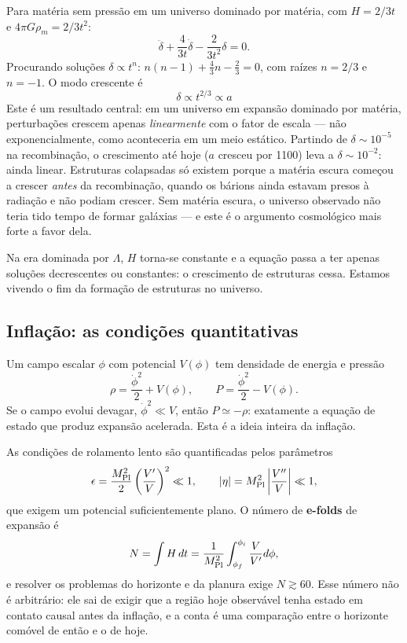 \documentclass[11pt,a4paper]{article}
\begin{document}
Para matéria sem pressão em um universo dominado por matéria, com $H=2/3t$ e $4\pi G\rho_m=2/3t^{2}$:
\[
\ddot{\delta}+\frac{4}{3t}\dot{\delta}-\frac{2}{3t^{2}}\delta=0.
\]
Procurando soluções $\delta\propto t^{n}$: $n(n-1)+\frac{4}{3}n-\frac{2}{3}=0$, com raízes $n=2/3$ e $n=-1$. O modo crescente é
\[
\boxed{\ \delta\propto t^{2/3}\propto a\ }
\]
Este é um resultado central: em um universo em expansão dominado por matéria, perturbações crescem apenas \emph{linearmente} com o fator de escala --- não exponencialmente, como aconteceria em um meio estático. Partindo de $\delta\sim10^{-5}$ na recombinação, o crescimento até hoje ($a$ cresceu por 1100) leva a $\delta\sim10^{-2}$: ainda linear. Estruturas colapsadas só existem porque a matéria escura começou a crescer \emph{antes} da recombinação, quando os bárions ainda estavam presos à radiação e não podiam crescer. Sem matéria escura, o universo observado não teria tido tempo de formar galáxias --- e este é o argumento cosmológico mais forte a favor dela.

Na era dominada por $\Lambda$, $H$ torna-se constante e a equação passa a ter apenas soluções decrescentes ou constantes: o crescimento de estruturas cessa. Estamos vivendo o fim da formação de estruturas no universo.

\subsection*{Inflação: as condições quantitativas}

Um campo escalar $\phi$ com potencial $V(\phi)$ tem densidade de energia e pressão
\[
\rho=\frac{\dot{\phi}^{2}}{2}+V(\phi),
\qquad
P=\frac{\dot{\phi}^{2}}{2}-V(\phi).
\]
Se o campo evolui devagar, $\dot{\phi}^{2}\ll V$, então $P\simeq-\rho$: exatamente a equação de estado que produz expansão acelerada. Esta é a ideia inteira da inflação.

As condições de rolamento lento são quantificadas pelos parâmetros
\[
\epsilon=\frac{M_{\rm Pl}^{2}}{2}\left(\frac{V'}{V}\right)^{2}\ll1,
\qquad
|\eta|=M_{\rm Pl}^{2}\left|\frac{V''}{V}\right|\ll1,
\]
que exigem um potencial suficientemente plano. O número de \textbf{e-folds} de expansão é
\[
N=\int H\,dt=\frac{1}{M_{\rm Pl}^{2}}\int_{\phi_f}^{\phi_i}\frac{V}{V'}d\phi,
\]
e resolver os problemas do horizonte e da planura exige $N\gtrsim60$. Esse número não é arbitrário: ele sai de exigir que a região hoje observável tenha estado em contato causal antes da inflação, e a conta é uma comparação entre o horizonte comóvel de então e o de hoje.
\end{document}
